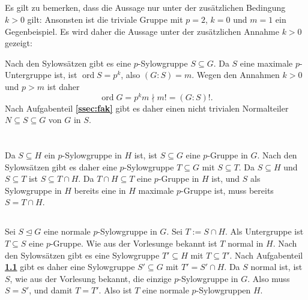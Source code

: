 \documentclass[a4paper,10pt]{article}
\theoremstyle{definition}
\newcommand{\ord}{\operatorname{ord}}
\begin{document}
\subsection{}
Es gilt zu bemerken, dass die Aussage nur unter der zusätzlichen Bedingung $k > 0$ gilt: Ansonsten ist die triviale Gruppe mit $p=2$, $k=0$ und $m=1$ ein Gegenbeispiel. Es wird daher die Aussage unter der zusätzlichen Annahme $k > 0$ gezeigt:

Nach den Sylowsätzen gibt es eine $p$-Sylowgruppe $S \subseteq G$. Da $S$ eine maximale $p$-Untergruppe ist, ist $\ord S = p^k$, also $(G : S) = m$. Wegen den Annahmen $k > 0$ und $p > m$ ist daher
\[
\ord G = p^k m \nmid m! = (G : S)!.
\]
Nach Aufgabenteil \textbf{\ref{ssec:fak}} gibt es daher einen nicht trivialen Normalteiler $N \subseteq S \subseteq G$ von $G$ in $S$.





\section{}


\subsection{}\label{ssc:Sylowschnitt}
Da $S \subseteq H$ ein $p$-Sylowgruppe in $H$ ist, ist $S \subseteq G$ eine $p$-Gruppe in $G$. Nach den Sylowsätzen gibt es daher eine $p$-Sylowgruppe $T \subseteq G$ mit $S \subseteq T$. Da $S \subseteq H$ und $S \subseteq T$ ist $S \subseteq T \cap H$. Da $T \cap H \subseteq T$ eine $p$-Gruppe in $H$ ist, und $S$ als Sylowgruppe in $H$ bereits eine in $H$ maximale $p$-Gruppe ist, muss bereits $S = T \cap H$.


\subsection{}
Sei $S \trianglelefteq G$ eine normale $p$-Sylowgruppe in $G$. Sei $T := S \cap H$. Als Untergruppe ist $T \subseteq S$ eine $p$-Gruppe. Wie aus der Vorlesunge bekannt ist $T$ normal in $H$. Nach den Sylowsätzen gibt es eine Sylowgruppe $T' \subseteq H$ mit $T \subseteq T'$. Nach Aufgabenteil \textbf{\ref{ssc:Sylowschnitt}} gibt es daher eine Sylowgruppe $S' \subseteq G$ mit $T' = S' \cap H$. Da $S$ normal ist, ist $S$, wie aus der Vorlesung bekannt, die einzige $p$-Sylowgruppe in $G$. Also muss $S = S'$, und damit $T = T'$. Also ist $T$ eine normale $p$-Sylowgruppen $H$.
\end{document}
